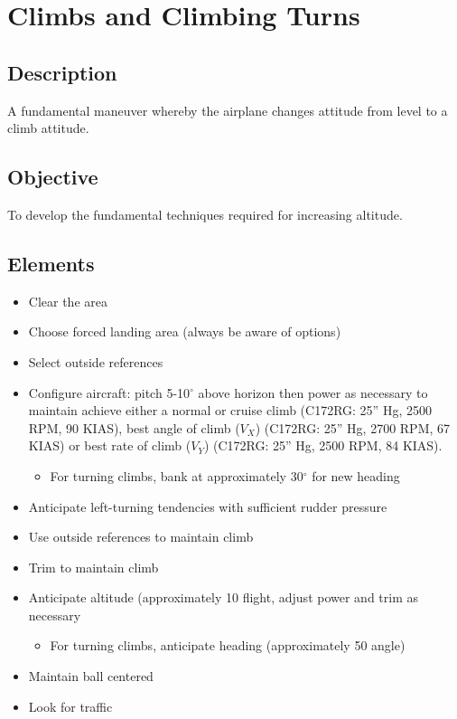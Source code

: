 \section{Climbs and Climbing Turns}

\subsection{Description}

A fundamental maneuver whereby the airplane changes attitude from level to a
climb attitude.

\subsection{Objective}

To develop the fundamental techniques required for increasing altitude.

\subsection{Elements}

\begin{itemize}
  \item Clear the area
  \item Choose forced landing area (always be aware of options) 
  \item Select outside references
  \item Configure aircraft: pitch 5-10$^\circ$ above horizon then power as necessary
    to maintain achieve either a normal or cruise climb (C172RG: 25'' Hg, 2500
    RPM, 90 KIAS), best angle of climb ($V_X$) (C172RG: 25'' Hg, 2700 RPM, 67
    KIAS) or best rate of climb ($V_Y$) (C172RG: 25'' Hg, 2500 RPM, 84 KIAS). 
    \begin{itemize}
      \item For turning climbs, bank at approximately 30$^\circ$ for new
        heading
    \end{itemize}
  \item Anticipate left-turning tendencies with sufficient rudder pressure
  \item Use outside references to maintain climb
  \item Trim to maintain climb
  \item Anticipate altitude (approximately 10%
    flight, adjust power and trim as necessary
    \begin{itemize}
      \item For turning climbs, anticipate heading (approximately 50%
        angle)
    \end{itemize}
  \item Maintain ball centered
  \item Look for traffic
\end{itemize}

